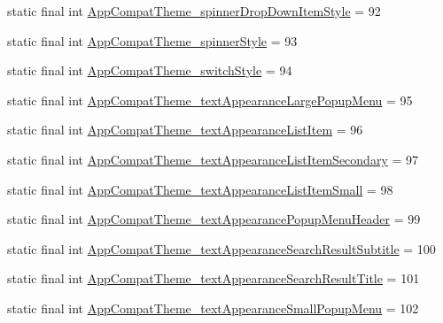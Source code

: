\begin{DoxyCompactItemize}
static final int \mbox{\hyperlink{classandroid_1_1support_1_1v7_1_1appcompat_1_1R_1_1styleable_aa05b8bf874f1bbfdcfd00c7f5c3c843a}{App\+Compat\+Theme\+\_\+spinner\+Drop\+Down\+Item\+Style}} = 92
\item 
static final int \mbox{\hyperlink{classandroid_1_1support_1_1v7_1_1appcompat_1_1R_1_1styleable_ad820426da217795f82a82162f3e7d97a}{App\+Compat\+Theme\+\_\+spinner\+Style}} = 93
\item 
static final int \mbox{\hyperlink{classandroid_1_1support_1_1v7_1_1appcompat_1_1R_1_1styleable_a75c82320cf03027b5a646781520a487d}{App\+Compat\+Theme\+\_\+switch\+Style}} = 94
\item 
static final int \mbox{\hyperlink{classandroid_1_1support_1_1v7_1_1appcompat_1_1R_1_1styleable_af281c6fbf8f934f14111b4c519715cdf}{App\+Compat\+Theme\+\_\+text\+Appearance\+Large\+Popup\+Menu}} = 95
\item 
static final int \mbox{\hyperlink{classandroid_1_1support_1_1v7_1_1appcompat_1_1R_1_1styleable_ad278dc07bb9fc2725bb8f64aa96e715a}{App\+Compat\+Theme\+\_\+text\+Appearance\+List\+Item}} = 96
\item 
static final int \mbox{\hyperlink{classandroid_1_1support_1_1v7_1_1appcompat_1_1R_1_1styleable_a7cf31b6e186e846267baf95bae5d2a86}{App\+Compat\+Theme\+\_\+text\+Appearance\+List\+Item\+Secondary}} = 97
\item 
static final int \mbox{\hyperlink{classandroid_1_1support_1_1v7_1_1appcompat_1_1R_1_1styleable_a12218feaabf910cc058fc5e7a3cc7c6a}{App\+Compat\+Theme\+\_\+text\+Appearance\+List\+Item\+Small}} = 98
\item 
static final int \mbox{\hyperlink{classandroid_1_1support_1_1v7_1_1appcompat_1_1R_1_1styleable_a56c4dbb25b7898571e573725449d46cc}{App\+Compat\+Theme\+\_\+text\+Appearance\+Popup\+Menu\+Header}} = 99
\item 
static final int \mbox{\hyperlink{classandroid_1_1support_1_1v7_1_1appcompat_1_1R_1_1styleable_aec08431e71de4105e4876aeaed08b1a7}{App\+Compat\+Theme\+\_\+text\+Appearance\+Search\+Result\+Subtitle}} = 100
\item 
static final int \mbox{\hyperlink{classandroid_1_1support_1_1v7_1_1appcompat_1_1R_1_1styleable_a34b89646184f0d996fbc0e3dcb2f4d4c}{App\+Compat\+Theme\+\_\+text\+Appearance\+Search\+Result\+Title}} = 101
\item 
static final int \mbox{\hyperlink{classandroid_1_1support_1_1v7_1_1appcompat_1_1R_1_1styleable_ad723935e264f9523d53349dbe526fedf}{App\+Compat\+Theme\+\_\+text\+Appearance\+Small\+Popup\+Menu}} = 102

\end{DoxyCompactItemize}
